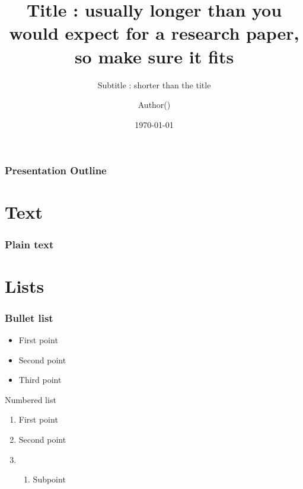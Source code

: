 \documentclass[
	11pt, %
	aspectratio=169, %
]{beamer}
\title{Title : usually longer than you would expect for a research paper, so make sure it fits}
\subtitle{Subtitle : shorter than the title}
\author{Author()}
\institute{ARAMIS Lab}
\date{\today}
\begin{document}

\begin{frame}
	\titlepage %
\end{frame}


\begin{frame}
	\frametitle{Presentation Outline} %
	\tableofcontents %
\end{frame}


\section{Text}

\begin{frame}
  \frametitle{Plain text}

  \lipsum[1][1-5]
  \vfill
  \lipsum[2][1-5]
  \vfill
  \lipsum[3][1-5]

\end{frame}

\section{Lists}

\begin{frame}
  \frametitle{Bullet list}

  \begin{itemize}
    \item First point
    \item Second point
    \item Third point
  \end{itemize} 

\end{frame}

\begin{frame}{Numbered list}
  \begin{enumerate}
    \item First point
    \item Second point
    \item \begin{enumerate}
      \item Subpoint
    \end{enumerate} 
  \end{enumerate}

\end{frame}
\end{document}
